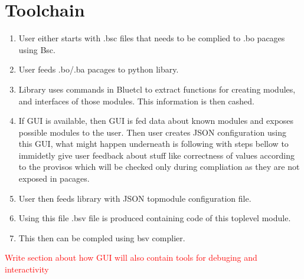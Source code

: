 \documentclass[14pt]{article}
\newcommand\todo[1]{\textcolor{red}{#1}}
\begin{document}
\section{Toolchain}
    \begin{enumerate}
        \item User either starts with .bsc files that needs to be complied to .bo pacages using Bsc.
        \item User feeds .bo/.ba pacages to python libary.
        \item Library uses commands in Bluetcl to extract functions for creating modules, and interfaces of those modules. This information is then cashed.
        \item If GUI is available, then GUI is fed data about known modules and exposes possible modules to the user. Then user creates JSON configuration using this GUI, what might happen underneath is following with steps bellow to immidetly give user feedback about stuff like correctness of values according to the provisos which will be checked only during compliation as they are not exposed in pacages. 
        \item User then feeds library with JSON topmodule configuration file.
        \item Using this file .bsv file is produced containing code of this toplevel module.
        \item This then can be compled using bsv complier. 
    \end{enumerate}
    \todo{Write section about how GUI will also contain tools for debuging and interactivity}
\end{document}
